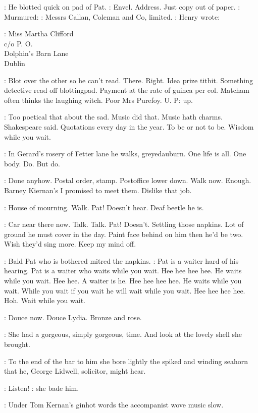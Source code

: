 :
He blotted quick on pad of Pat.
\BloomInt:
Envel. Address. Just copy out of paper.
:
Murmured:
\BloomInt:
Messrs Callan, Coleman and Co, limited.
:
Henry wrote:

:
        Miss Martha Clifford\\
            c/o P. O.\\
                Dolphin's Barn Lane\\
                     Dublin

\BloomInt:
Blot over the other so he can't read. There. Right. Idea prize titbit.
Something detective read off blottingpad. Payment at the rate of guinea
per col. Matcham often thinks the laughing witch. Poor Mrs Purefoy. U. P:
up.

\BloomInt:
Too poetical that about the sad. Music did that. Music hath charms.
Shakespeare said. Quotations every day in the year. To be or not to be.
Wisdom while you wait.

\BloomInt:
In Gerard's rosery of Fetter lane he walks, greyedauburn. One life is
all. One body. Do. But do.

\BloomInt:
Done anyhow. Postal order, stamp. Postoffice lower down. Walk
now. Enough.
Barney Kiernan's I promised to meet them. Dislike that job.

\BloomInt:
House of mourning. Walk. Pat! Doesn't hear. Deaf beetle he is.

\BloomInt:
Car near there now. Talk. Talk. Pat! Doesn't. Settling those napkins.
Lot of ground he must cover in the day. Paint face behind on him then he'd
be two. Wish they'd sing more. Keep my mind off.

:
Bald Pat who is bothered mitred the napkins.
\BloomInt:
Pat is a waiter hard of
his hearing. Pat is a waiter who waits while you wait. Hee hee hee hee. He
waits while you wait. Hee hee. A waiter is he. Hee hee hee hee. He waits
while you wait. While you wait if you wait he will wait while you wait.
Hee hee hee hee. Hoh. Wait while you wait.

:
Douce now.
Douce Lydia. Bronze and rose.

:
She had a gorgeous, simply gorgeous, time. And look at the lovely
shell she brought.

:
To the end of the bar to him she bore lightly the spiked and winding
seahorn that he, George Lidwell, solicitor, might hear.

\MissD:
Listen!
:
she bade him.

:
Under Tom Kernan's ginhot words the accompanist wove music slow.


